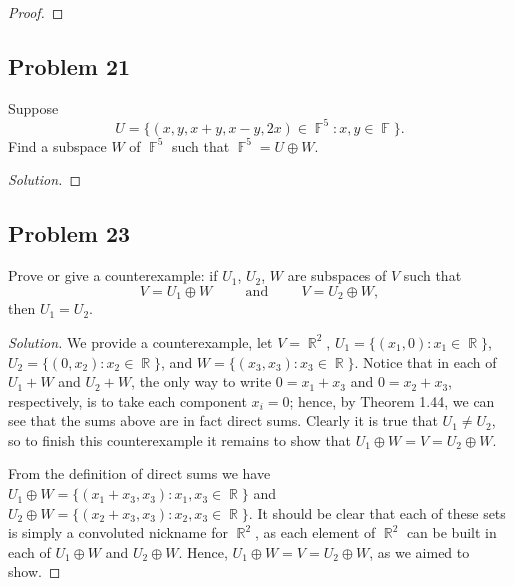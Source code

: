 \documentclass[letterpaper, 12pt]{amsart}
\DeclareMathOperator{\R}{\mathbb{R}}
\DeclareMathOperator{\F}{\mathbb{F}}
\theoremstyle{definition}  %
\begin{document}
		\begin{proof}
		\end{proof}		

		\subsection*{Problem 21}
		Suppose $$U = \{ (x,y,x+y,x-y,2x) \in \F^{5} : x, y \in \F \}.$$ 
		Find a subspace $W$ of $\F^{5}$ such that $\F^{5} = U \oplus W$.

		\begin{proof}[Solution]
		\end{proof}

		\subsection*{Problem 23}
		Prove or give a counterexample: if $U_{1}$, $U_{2}$, $W$ are subspaces of $V$ such that	$$V = U_{1} \oplus W \hspace{1cm} \text{and} \hspace{1cm} V = U_{2} \oplus W,$$ then $U_{1} = U_{2}$. 

		\begin{proof}[Solution]
		We provide a counterexample, let $V = \R^{2}$, $U_{1} = \{ (x_{1},0) : x_{1} \in \R \}$, $U_{2} = \{ (0,x_{2}) : x_{2} \in \R \}$, and $W = \{ (x_{3},x_{3}) : x_{3} \in \R \}$.
		Notice that in each of $U_{1} + W$ and $U_{2} + W$, the only way to write $0 = x_{1} + x_{3}$ and $0 = x_{2} + x_{3}$, respectively, is to take each component $x_{i} = 0$; hence, by Theorem 1.44, we can see that the sums above are in fact direct sums.
		Clearly it is true that $U_{1} \neq U_{2}$, so to finish this counterexample it remains to show that $U_{1} \oplus W = V = U_{2} \oplus W$.

		From the definition of direct sums we have $U_{1} \oplus W = \{ (x_{1} + x_{3}, x_{3}) : x_{1},x_{3} \in \R \}$ and $U_{2} \oplus W = \{ (x_{2} + x_{3}, x_{3}) : x_{2},x_{3} \in \R \}$.
		It should be clear that each of these sets is simply a convoluted nickname for $\R^{2}$, as each element of $\R^{2}$ can be built in each of $U_{1} \oplus W$ and $U_{2} \oplus W$.
		Hence, $U_{1} \oplus W = V = U_{2} \oplus W$, as we aimed to show.
		\end{proof}
\end{document}
